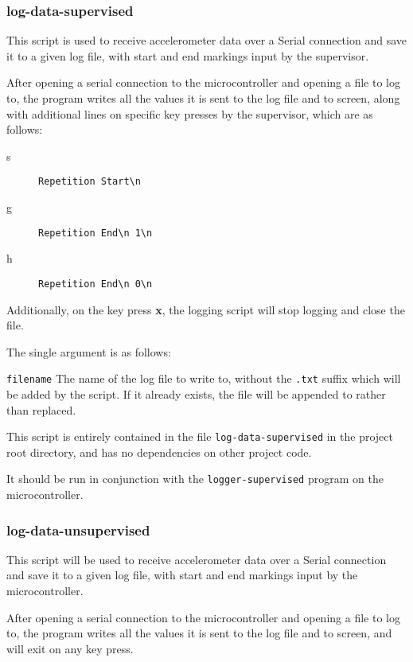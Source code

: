\documentclass[a4paper]{article}
\begin{document}
\subsubsection{log-data-supervised}
\label{subsubsec:dc_csa_logsupervised}

This script is used to receive accelerometer data over a Serial connection and save it to a given log file, with start and end markings input by the supervisor.

After opening a serial connection to the microcontroller and opening a file to log to, the program writes all the values it is sent to the log file and to screen, along with additional lines on specific key presses by the supervisor, which are as follows:

\begin{description}
\item[s] \lstinline|Repetition Start\n|
\item[g] \lstinline|Repetition End\n 1\n|
\item[h] \lstinline|Repetition End\n 0\n|
\end{description}

Additionally, on the key press \textbf{x}, the logging script will stop logging and close the file.

The single argument is as follows:

\lstinline{filename} The name of the log file to write to, without the \lstinline{.txt} suffix which will be added by the script. If it already exists, the file will be appended to rather than replaced.

This script is entirely contained in the file \lstinline{log-data-supervised} in the project root directory, and has no dependencies on other project code.

It should be run in conjunction with the \lstinline{logger-supervised} program on the microcontroller.

\subsubsection{log-data-unsupervised}
\label{subsubsec:dc_csa_logunsupervised}

This script will be used to receive accelerometer data over a Serial connection and save it to a given log file, with start and end markings input by the microcontroller.

After opening a serial connection to the microcontroller and opening a file to log to, the program writes all the values it is sent to the log file and to screen, and will exit on any key press.
\end{document}
